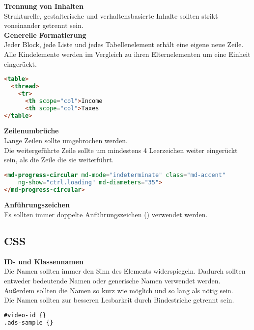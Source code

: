 \textbf{Trennung von Inhalten}\\
Strukturelle, gestalterische und verhaltensbasierte Inhalte sollten strikt voneinander getrennt sein.\\

\textbf{Generelle Formatierung}\\
Jeder Block, jede Liste und jedes Tabellenelement erhält eine eigene neue Zeile.\\
Alle Kindelemente werden im Vergleich zu ihren Elternelementen um eine Einheit eingerückt.
\begin{lstlisting}[language = HTML, caption = Generelle Formatierung von HTML Dokumenten, label = formatting]
<table>
  <thread>
  	<tr>
  	  <th scope="col">Income
  	  <th scope="col">Taxes
</table>
\end{lstlisting}

\textbf{Zeilenumbrüche}\\
Lange Zeilen sollte umgebrochen werden.\\
Die weitergeführte Zeile sollte um mindestens 4 Leerzeichen weiter eingerückt sein, als die Zeile die sie weiterführt.
\begin{lstlisting}[language = HTML, caption = Zeilenumbrüche, label = line-wrapping]
<md-progress-circular md-mode="indeterminate" class="md-accent"
	ng-show="ctrl.loading" md-diameters="35">
</md-progress-circular>
\end{lstlisting}

\textbf{Anführungszeichen}\\
Es sollten immer doppelte Anführungszeichen (\grqq \grqq) verwendet werden.\\

\subsection{CSS}
\textbf{ID- und Klassennamen}\\
Die Namen sollten immer den Sinn des Elements widerspiegeln. Dadurch sollten entweder bedeutende Namen oder generische Namen verwendet werden.\\ 
Außerdem sollten die Namen so kurz wie möglich und so lang als nötig sein.\\
Die Namen sollten zur besseren Lesbarkeit durch Bindestriche getrennt sein.
\begin{lstlisting}[language = HTML, caption = ID- und Klassennamen, label = doctype]
#video-id {}
.ads-sample {}
\end{lstlisting}


